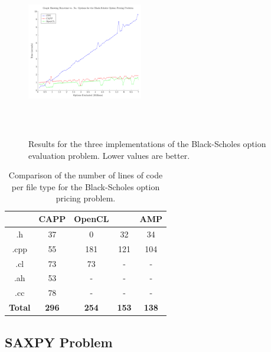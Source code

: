 \documentclass{sig-alternate-05-2015}
\begin{document}
\begin{figure}[!t]
	\centering
	\includegraphics[height=7.5cm,width=0.45\textwidth]{BlackScholes}
	\caption{Results for the three implementations of the Black-Scholes option
		evaluation problem. Lower values are better.}
	\label{fig:blackscholes}
\end{figure}

\begin{table}[!b]
\centering
\caption{Comparison of the number of lines of code per file type for the
Black-Scholes option pricing problem.}
\label{tab:blackscholes}
\begin{tabular}{|c|c|c|c|c|} 
	\hline
                    & CAPP			& OpenCL		& \CPP		& \CPP AMP          \\ \hline
    .h				& 37			& 0				& 32		& 34                \\ \hline
    .cpp			& 55			& 181			& 121		& 104               \\ \hline
    .cl				& 73			& 73			& -			& -                 \\ \hline
    .ah				& 53			& -				& -			& -                 \\ \hline
    .cc				& 78			& -				& -			& -                 \\ \hline
    \textbf{Total}	& \textbf{296}	& \textbf{254}	& \textbf{153}	& \textbf{138}	\\ \hline		
\hline
\end{tabular}
\end{table}

\subsection{SAXPY Problem}
\end{document}
